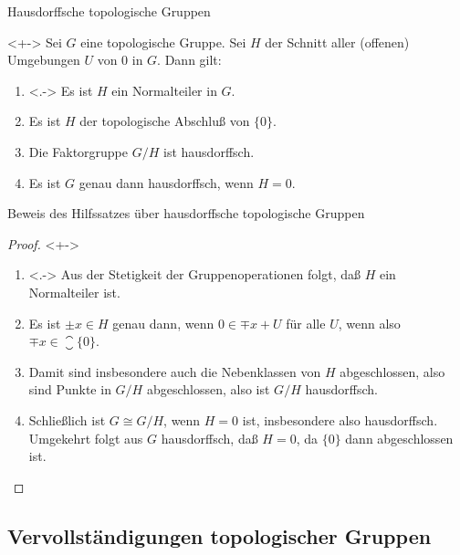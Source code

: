 \begin{frame}{Hausdorffsche topologische Gruppen}
	\begin{lemma}<+->
		Sei \(G\) eine topologische Gruppe.
		Sei \(H\) der Schnitt aller (offenen) Umgebungen \(U\) von \(0\) in \(G\). Dann
		gilt:
		\begin{enumerate}[<+->]
		\item<.->
			Es ist \(H\) ein Normalteiler in \(G\).
		\item
			Es ist \(H\) der topologische Abschluß von \(\{0\}\).
		\item
			Die Faktorgruppe \(G/H\) ist hausdorffsch.
		\item
			Es ist \(G\) genau dann hausdorffsch, wenn \(H = 0\).
		\end{enumerate}
	\end{lemma}
\end{frame}

\begin{frame}{Beweis des Hilfssatzes über hausdorffsche topologische Gruppen}
	\begin{proof}<+->
		\begin{enumerate}[<+->]
		\item<.->
			Aus der Stetigkeit der Gruppenoperationen folgt, daß \(H\) ein Normalteiler ist.
		\item
			Es ist \(\pm x \in H\) genau dann, wenn \(0 \in \mp x + U\) für alle \(U\), wenn also \(\mp x \in \closure{\{0\}}\).
		\item
			Damit sind insbesondere auch die Nebenklassen von \(H\) abgeschlossen, also sind
			Punkte in \(G/H\) abgeschlossen, also ist \(G/H\) hausdorffsch.
		\item
			Schließlich ist \(G \cong G/H\), wenn \(H = 0\) ist, insbesondere also hausdorffsch. Umgekehrt
			folgt aus \(G\) hausdorffsch, daß \(H = 0\), da \(\{0\}\) dann abgeschlossen ist.
			\qedhere
		\end{enumerate}
	\end{proof}
\end{frame}

\subsection{Vervollständigungen topologischer Gruppen}

